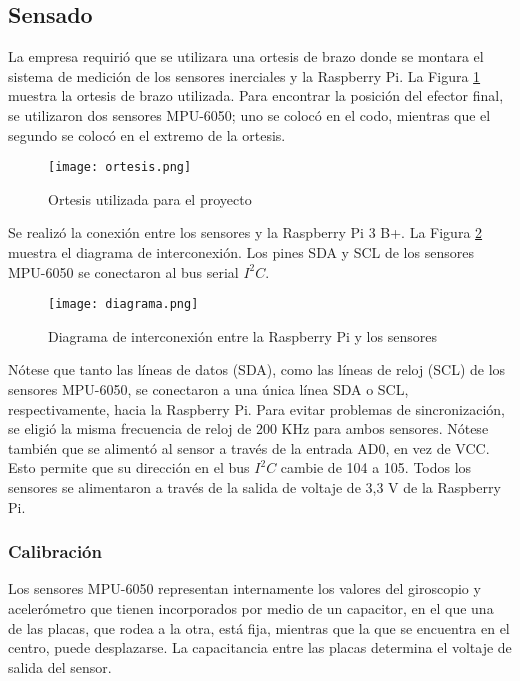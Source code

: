 \subsection{Sensado}

La empresa requirió que se utilizara una ortesis de brazo donde se montara el sistema de medición de los sensores inerciales y la Raspberry Pi. La Figura \ref{fig:ortesis} muestra la ortesis de brazo utilizada. Para encontrar la posición del efector final, se utilizaron dos sensores MPU-6050; uno se colocó en el codo, mientras que el segundo se colocó en el extremo de la ortesis.

\begin{figure}[htb]
	\centering
	{\texttt{[image: ortesis.png]}}
	\caption{Ortesis utilizada para el proyecto}
	\label{fig:ortesis}
\end{figure}

Se realizó la conexión entre los sensores y la Raspberry Pi 3 B+. La Figura \ref{fig:diagrama} muestra el diagrama de interconexión. Los pines SDA y SCL de los sensores MPU-6050 se conectaron al bus serial $I^2C$.

\begin{figure}[htb]
	\centering
	\texttt{[image: diagrama.png]}
	\caption{Diagrama de interconexión entre la Raspberry Pi y los sensores}
	\label{fig:diagrama}
\end{figure}

Nótese que tanto las líneas de datos (SDA), como las líneas de reloj (SCL) de los sensores MPU-6050, se conectaron a una única línea SDA o SCL, respectivamente, hacia la Raspberry Pi. Para evitar problemas de sincronización, se eligió la misma frecuencia de reloj de 200 KHz para ambos sensores. Nótese también que se alimentó al sensor a través de la entrada AD0, en vez de VCC. Esto permite que su dirección en el bus $I^2C$ cambie de 104 a 105. Todos los sensores se alimentaron a través de la salida de voltaje de 3,3 V de la Raspberry Pi.

\subsubsection{Calibración}

Los sensores MPU-6050 representan internamente los valores del giroscopio y acelerómetro que tienen incorporados por medio de un capacitor, en el que una de las placas, que rodea a la otra, está fija, mientras que la que se encuentra en el centro, puede desplazarse. La capacitancia entre las placas determina el voltaje de salida del sensor.

